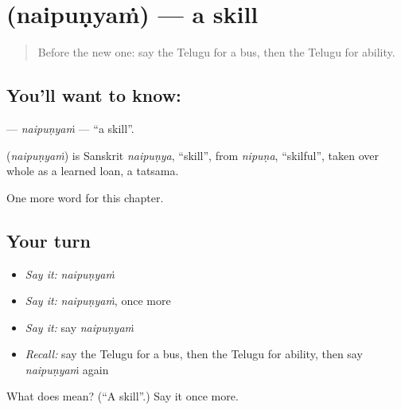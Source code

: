 \section[\texorpdfstring{\te{నైపుణ్యం} (naipuṇyaṁ)}{నైపుణ్యం (naipuṇyaṁ)}]{ (naipuṇyaṁ) — a skill}

\label{lesson:TE-C105-naipunyam}



\begin{quote}
Before the new one: say the Telugu for a bus, then the Telugu for ability.
\end{quote}

\subsection*{You'll want to know: }
\textbf{} — \emph{naipuṇyaṁ} — \textquotedblleft{}a skill\textquotedblright{}.

\begin{cousinweb}
\textbf{} (\emph{naipuṇyaṁ}) is Sanskrit \emph{naipuṇya}, \textquotedblleft{}skill\textquotedblright{}, from \emph{nipuṇa}, \textquotedblleft{}skilful\textquotedblright{}, taken over whole as a learned loan, a tatsama.
\end{cousinweb}

\begin{grammarlens}[title={What you've built}]
One more word for this chapter.
\end{grammarlens}

\subsection*{Your turn}
\begin{itemize}
\raggedright
  \item \emph{Say it:} \emph{naipuṇyaṁ}
  \item \emph{Say it:} \emph{naipuṇyaṁ}, once more
  \item \emph{Say it:} say \emph{naipuṇyaṁ}
  \item \emph{Recall:} say the Telugu for a bus, then the Telugu for ability, then say \emph{naipuṇyaṁ} again
\end{itemize}

\begin{tcolorbox}[breakable,colback=teal!4,colframe=teal!35!black,title={Before you move on}]
What does  mean? (\textquotedblleft{}A skill\textquotedblright{}.) Say it once more.
\end{tcolorbox}
